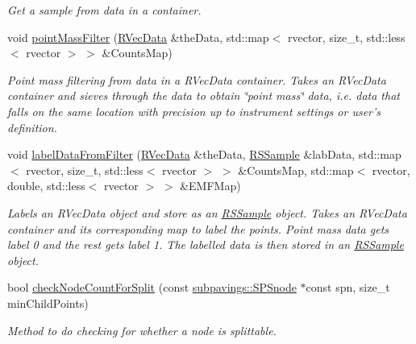 \begin{DoxyCompactItemize}
\begin{DoxyCompactList}\small\item\em \-Get a sample from data in a container. \end{DoxyCompactList}\item 
void \hyperlink{namespacesubpavings_a1e3a19279d328b2178aaac44beaaf2d6}{point\-Mass\-Filter} (\hyperlink{namespacesubpavings_a30e15e24c8d81a2160d7422ef3c39d68}{\-R\-Vec\-Data} \&the\-Data, std\-::map$<$ rvector, size\-\_\-t, std\-::less$<$ rvector $>$ $>$ \&\-Counts\-Map)
\begin{DoxyCompactList}\small\item\em \-Point mass filtering from data in a \-R\-Vec\-Data container. \-Takes an \-R\-Vec\-Data container and sieves through the data to obtain \char`\"{}point mass\char`\"{} data, i.\-e. data that falls on the same location with precision up to instrument settings or user's definition. \end{DoxyCompactList}\item 
void \hyperlink{namespacesubpavings_ab434c49dd2b267948d0048075ab0298c}{label\-Data\-From\-Filter} (\hyperlink{namespacesubpavings_a30e15e24c8d81a2160d7422ef3c39d68}{\-R\-Vec\-Data} \&the\-Data, \hyperlink{classRSSample}{\-R\-S\-Sample} \&lab\-Data, std\-::map$<$ rvector, size\-\_\-t, std\-::less$<$ rvector $>$ $>$ \&\-Counts\-Map, std\-::map$<$ rvector, double, std\-::less$<$ rvector $>$ $>$ \&\-E\-M\-F\-Map)
\begin{DoxyCompactList}\small\item\em \-Labels an \-R\-Vec\-Data object and store as an \hyperlink{classRSSample}{\-R\-S\-Sample} object. \-Takes an \-R\-Vec\-Data container and its corresponding map to label the points. \-Point mass data gets label 0 and the rest gets label 1. \-The labelled data is then stored in an \hyperlink{classRSSample}{\-R\-S\-Sample} object. \end{DoxyCompactList}\item 
bool \hyperlink{namespacesubpavings_af04d789b7f68d18ba75461caa4627c39}{check\-Node\-Count\-For\-Split} (const \hyperlink{classsubpavings_1_1SPSnode}{subpavings\-::\-S\-P\-Snode} $\ast$const spn, size\-\_\-t min\-Child\-Points)
\begin{DoxyCompactList}\small\item\em \-Method to do checking for whether a node is splittable. \end{DoxyCompactList}\end{DoxyCompactItemize}
